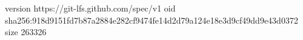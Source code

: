 version https://git-lfs.github.com/spec/v1
oid sha256:918d9151fd7b87a2884e282cf9474fe14d2d79a124e18e3d9cf49dd9e43d0372
size 263326

